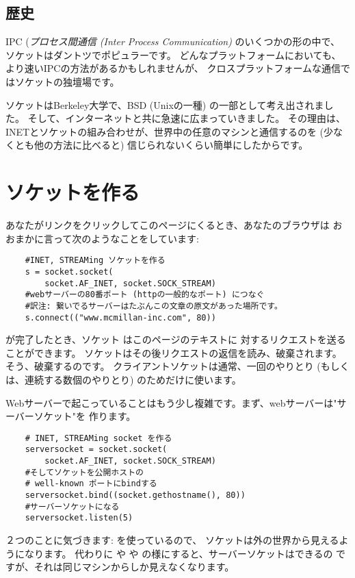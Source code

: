\documentclass{howto}
\begin{document}
\subsection{歴史}

IPC (\emph{プロセス間通信 (Inter Process Communication)} のいくつかの形の中で、
ソケットはダントツでポピュラーです。
どんなプラットフォームにおいても、より速いIPCの方法があるかもしれませんが、
クロスプラットフォームな通信ではソケットの独壇場です。

ソケットはBerkeley大学で、BSD (Unixの一種) の一部として考え出されました。
そして、インターネットと共に急速に広まっていきました。
その理由は、INETとソケットの組み合わせが、世界中の任意のマシンと通信するのを
(少なくとも他の方法に比べると) 信じられないくらい簡単にしたからです。

\section{ソケットを作る}

あなたがリンクをクリックしてこのページにくるとき、あなたのブラウザは
おおまかに言って次のようなことをしています:

\begin{verbatim}
    #INET, STREAMing ソケットを作る
    s = socket.socket(
        socket.AF_INET, socket.SOCK_STREAM)
    #webサーバーの80番ポート (httpの一般的なポート) につなぐ
    #訳注: 繋いでるサーバーはたぶんこの文章の原文があった場所です。
    s.connect(("www.mcmillan-inc.com", 80))
\end{verbatim}

が完了したとき、ソケット  はこのページのテキストに
対するリクエストを送ることができます。
ソケットはその後リクエストの返信を読み、破棄されます。そう、破棄するのです。
クライアントソケットは通常、一回のやりとり (もしくは、連続する数個のやりとり)
のためだけに使います。

Webサーバーで起こっていることはもう少し複雑です。まず、webサーバーは"サーバーソケット"を
作ります。

\begin{verbatim}
    # INET, STREAMing socket を作る
    serversocket = socket.socket(
        socket.AF_INET, socket.SOCK_STREAM)
    #そしてソケットを公開ホストの
    # well-known ポートにbindする
    serversocket.bind((socket.gethostname(), 80))
    #サーバーソケットになる
    serversocket.listen(5)
\end{verbatim}

２つのことに気づきます:  を使っているので、
ソケットは外の世界から見えるようになります。
代わりに  や  や
 の様にすると、サーバーソケットはできるの
ですが、それは同じマシンからしか見えなくなります。
\end{document}
